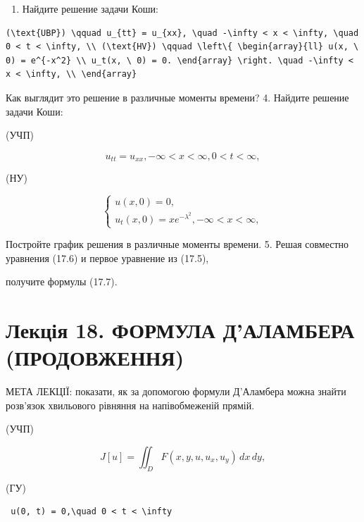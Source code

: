 \documentclass[
  ukrainian,
]{article}
\providecommand{\tightlist}{%
  \setlength{\itemsep}{0pt}\setlength{\parskip}{0pt}}
\begin{document}
\begin{enumerate}
\def\labelenumi{\arabic{enumi}.}
\setcounter{enumi}{2}
\tightlist
\item
  Найдите решение задачи Коши:
\end{enumerate}

\begin{verbatim}
(\text{UBP}) \qquad u_{tt} = u_{xx}, \quad -\infty < x < \infty, \quad 0 < t < \infty, \\ (\text{HV}) \qquad \left\{ \begin{array}{ll} u(x, \ 0) = e^{-x^2} \\ u_t(x, \ 0) = 0. \end{array} \right. \quad -\infty < x < \infty, \\ \end{array}
\end{verbatim}

Как выглядит это решение в различные моменты времени? 4. Найдите решение
задачи Коши:

(УЧП)

\[
u_{tt} = u_{xx}, -\infty < x < \infty, 0 < t < \infty,
\]

(НУ)

\[
\begin{cases} u(x, 0) = 0, \\ u_t(x, 0) = xe^{-\lambda^2}, -\infty < x < \infty, \end{cases}
\]

Постройте график решения в различные моменты времени. 5. Решая совместно
уравнения (17.6) и первое уравнение из (17.5),

получите формулы (17.7).

\section{Лекція 18. ФОРМУЛА Д'АЛАМБЕРА
(ПРОДОВЖЕННЯ)}\label{ux43bux435ux43aux446ux456ux44f-18.-ux444ux43eux440ux43cux443ux43bux430-ux434ux430ux43bux430ux43cux431ux435ux440ux430-ux43fux440ux43eux434ux43eux432ux436ux435ux43dux43dux44f}

МЕТА ЛЕКЦІЇ: показати, як за допомогою формули Д'Аламбера можна знайти
розв'язок хвильового рівняння на напівобмеженій прямій.

(УЧП)

\[
J[u] = \iint_D F(x, y, u, u_x, u_y)\,dx\,dy,
\]

(ГУ)

\begin{verbatim}
 u(0, t) = 0,\quad 0 < t < \infty 
\end{verbatim}
\end{document}
